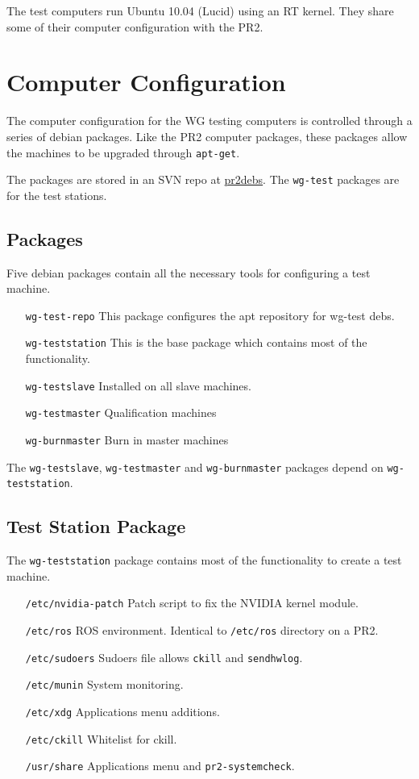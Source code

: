 \documentclass[11pt]{report}
\begin{document}
The test computers run Ubuntu 10.04 (Lucid) using an RT kernel. They share some of their computer configuration with the PR2.

\section{Computer Configuration}

The computer configuration for the WG testing computers is controlled through a series of debian packages. Like the PR2 computer packages, these packages allow the machines to be upgraded through \texttt{apt-get}.

The packages are stored in an SVN repo at \href{https://code.ros.org/svn/pr2debs/trunk}{pr2debs}. The \texttt{wg-test} packages are for the test stations.

\subsection{Packages}

Five debian packages contain all the necessary tools for configuring a test machine. 

\begin{itemize}
\item [\texttt{wg-test-repo}] This package configures the apt repository for wg-test debs.
\item [\texttt{wg-teststation}] This is the base package which contains most of the functionality.
\item [\texttt{wg-testslave}] Installed on all slave machines.
\item [\texttt{wg-testmaster}] Qualification machines
\item [\texttt{wg-burnmaster}] Burn in master machines
\end{itemize}

The \texttt{wg-testslave}, \texttt{wg-testmaster} and \texttt{wg-burnmaster} packages depend on \texttt{wg-teststation}.

\subsection{Test Station Package}

The \texttt{wg-teststation} package contains most of the functionality to create a test machine.

\begin{itemize}
\item [\texttt{/etc/nvidia-patch}] Patch script to fix the NVIDIA kernel module.
\item [\texttt{/etc/ros}] ROS environment. Identical to \texttt{/etc/ros} directory on a PR2.
\item [\texttt{/etc/sudoers}] Sudoers file allows \texttt{ckill} and \texttt{sendhwlog}.
\item [\texttt{/etc/munin}] System monitoring.
\item [\texttt{/etc/xdg}] Applications menu additions.
\item [\texttt{/etc/ckill}] Whitelist for ckill.
\item [\texttt{/usr/share}] Applications menu and \texttt{pr2-systemcheck}.
\end{itemize}
\end{document}
